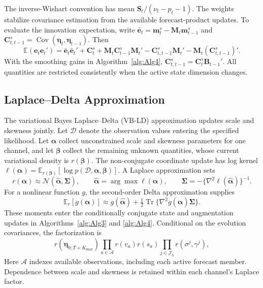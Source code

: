 \documentclass[APA,STIX1COL]{WileyNJD-v2}
\begin{document}
The inverse-Wishart convention has mean $\mathbf S_t/(\nu_t-p_t-1)$. The weights stabilize covariance estimation from the available forecast-product updates. To evaluate the innovation expectation, write $\bar{\mathbf e}_t=\mathbf m_t^s-\mathbf M_t\mathbf m_{t-1}^s$ and $\mathbf C_{t,t-1}^s=\operatorname{Cov}(\boldsymbol\eta_t,\boldsymbol\eta_{t-1})$. Then
\[
\mathbb E(\mathbf e_t\mathbf e_t')=
\bar{\mathbf e}_t\bar{\mathbf e}_t'+\mathbf C_t^s+
\mathbf M_t\mathbf C_{t-1}^s\mathbf M_t'
-\mathbf C_{t,t-1}^s\mathbf M_t'-\mathbf M_t(\mathbf C_{t,t-1}^s)'.
\]
With the smoothing gains in Algorithm~\ref{alg:Alg4}, $\mathbf C_{t,t-1}^s=\mathbf C_t^s\mathbf B_{t-1}'$. All quantities are restricted consistently when the active state dimension changes.

\subsection{Laplace--Delta Approximation}
\label{app:vblad}

The variational Bayes Laplace--Delta (VB-LD) approximation updates scale and skewness jointly. Let \(\mathcal D\) denote the observation values entering the specified likelihood. Let \(\boldsymbol\alpha\) collect unconstrained scale and skewness parameters for one channel, and let \(\boldsymbol\beta\) collect the remaining unknown quantities, whose current variational density is \(r(\boldsymbol\beta)\). The non-conjugate coordinate update has log kernel
\(\ell(\boldsymbol\alpha)=\mathbb E_{r(\boldsymbol\beta)}[\log p(\mathcal D,\boldsymbol\alpha,\boldsymbol\beta)]\).
A Laplace approximation sets
\[
r(\boldsymbol\alpha)\approx\mathcal N(\widehat{\boldsymbol\alpha},\boldsymbol\Sigma),\qquad
\widehat{\boldsymbol\alpha}=\arg\max\ell(\boldsymbol\alpha),\qquad
\boldsymbol\Sigma=-\{\nabla^2\ell(\widehat{\boldsymbol\alpha})\}^{-1}.
\]
For a nonlinear function \(g\), the second-order Delta approximation supplies
\[
\mathbb E_r[g(\boldsymbol\alpha)]\approx g(\widehat{\boldsymbol\alpha})+
\tfrac12\operatorname{Tr}\{\nabla^2g(\widehat{\boldsymbol\alpha})\boldsymbol\Sigma\}.
\]
These moments enter the conditionally conjugate state and augmentation updates in Algorithms~\ref{alg:Alg3} and \ref{alg:Alg4}. Conditional on the evolution covariances, the factorization is
\[
r(\boldsymbol\eta_{0:T+K_{\max}})\prod_{a\in\mathcal A}r(v_a)r(s_a)
\prod_{j\in\mathcal J_0}r(\sigma^j,\gamma^j),
\]
Here $\mathcal A$ indexes available observations, including each active forecast member. Dependence between scale and skewness is retained within each channel's Laplace factor.
\end{document}
